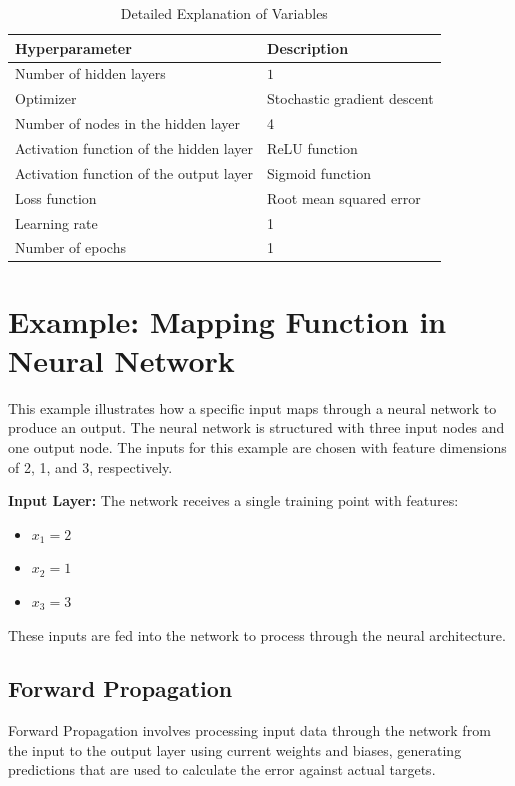     \begin{table}[H] %
    \centering
    \caption{Detailed Explanation of Variables}
    \label{tab:variables}
    \begin{tabularx}{\textwidth}{KL} %
    \toprule

    \textbf{Hyperparameter} & \textbf{Description} \\
    \midrule
    Number of hidden layers & $1$ \\
    Optimizer & Stochastic gradient descent \\
    Number of nodes in the hidden layer & 4 \\ 
    Activation function of the hidden layer & ReLU function \\
    Activation function of the output layer & Sigmoid function \\
    Loss function & Root mean squared error \\ 
    Learning rate & 1 \\ 
    Number of epochs & 1 \\ 

    \bottomrule
    \end{tabularx}
    \end{table}

\section{Example: Mapping Function in Neural Network}
    This example illustrates how a specific input maps through a neural network to produce an output. The neural network is structured with three input nodes and one output node. The inputs for this example are chosen with feature dimensions of 2, 1, and 3, respectively.

    \vspace{5mm}

    \noindent \textbf{Input Layer:} The network receives a single training point with features:
        \begin{itemize}
            \item $x_1 = 2$ 
            \item $x_2 = 1$ 
            \item $x_3 = 3$ 
        \end{itemize}
        These inputs are fed into the network to process through the neural architecture.

    \subsection{Forward Propagation}
    Forward Propagation involves processing input data through the network from the input to the output layer using current weights and biases, generating predictions that are used to calculate the error against actual targets.


